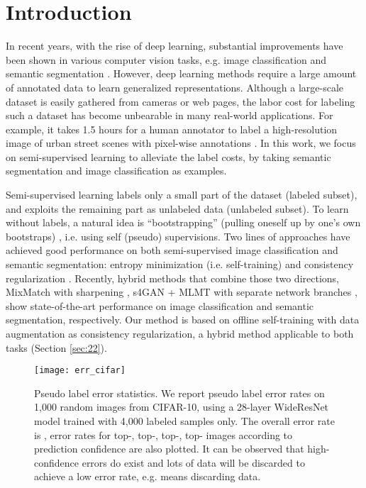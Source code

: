 \documentclass[preprint,review,10pt]{elsarticle}
\begin{document}
\section{Introduction}
\label{sec:1}

In recent years, with the rise of deep learning, substantial improvements have been shown in various computer vision tasks, e.g. image classification \cite{zagoruyko2016wide,wu2019wider} and semantic segmentation \cite{deeplabv2,zhao2017pyramid}. However, deep learning methods require a large amount of annotated data to learn generalized representations. Although a large-scale dataset is easily gathered from cameras or web pages, the labor cost for labeling such a dataset has become unbearable in many real-world applications. For example, it takes 1.5 hours for a human annotator to label a high-resolution image of urban street scenes with pixel-wise annotations \cite{cordts2016cityscapes}.
In this work, we focus on semi-supervised learning to alleviate the label costs, by taking semantic segmentation and image classification as examples.


Semi-supervised learning labels only a small part of the dataset (labeled subset), and exploits the remaining part as unlabeled data (unlabeled subset). To learn without labels, a natural idea is  ``bootstrapping'' (pulling oneself up by one's own bootstraps) \cite{yarowsky1995unsupervised}, i.e. using self (pseudo) supervisions.
Two lines of approaches have achieved good performance on both semi-supervised image classification and semantic segmentation: entropy minimization (i.e. self-training) \cite{lee2013pseudo,hung} and consistency regularization \cite{tarvainen2017mean,french2019semisupervised}. Recently, hybrid methods that combine those two directions, MixMatch with sharpening \cite{berthelot2019mixmatch}, s4GAN + MLMT with separate network branches \cite{mittal2019semi}, show state-of-the-art performance on image classification and semantic segmentation, respectively. Our method is based on offline self-training with data augmentation as consistency regularization, a hybrid method applicable to both tasks (Section \ref{sec:22}).

\begin{figure}[t]
\centering
\texttt{[image: err\_cifar]}
\caption{Pseudo label error statistics. We report pseudo label error rates on 1,000 random images from CIFAR-10, using a 28-layer WideResNet model trained with 4,000 labeled samples only. The overall error rate is , error rates for top-, top-, top-, top- images according to prediction confidence are also plotted. It can be observed that high-confidence errors do exist and lots of data will be discarded to achieve a low error rate, e.g.  means discarding  data. }
\label{fig2}
\end{figure}
\end{document}
